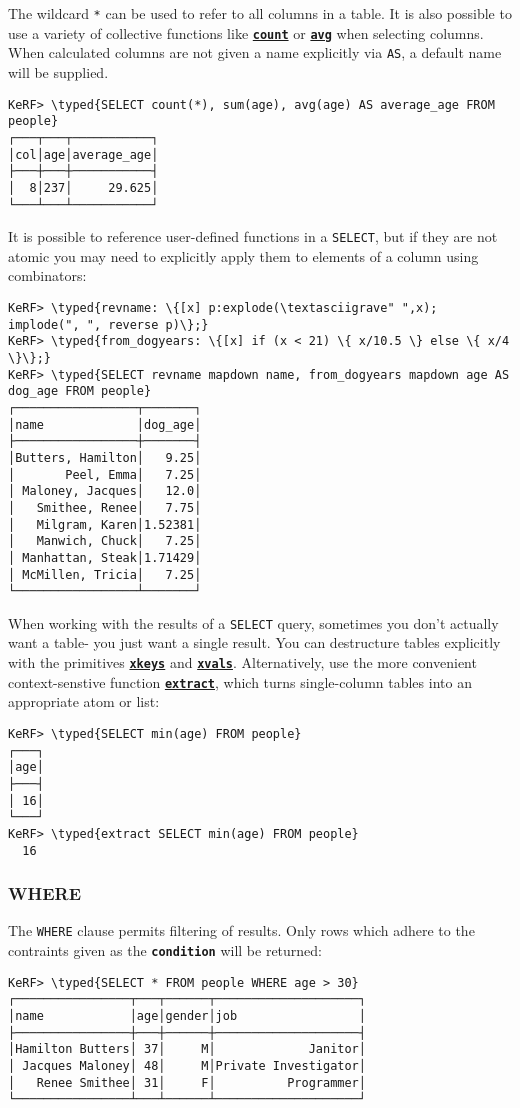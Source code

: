 \documentclass{article}
\newcommand{\typed}[1]{\textcolor{TealBlue}{#1}}
\newcommand{\metasyn}[1]{\texttt{\textbf{#1}}}
\newcommand{\primu}[2]{\hyperref[prim:#2]{\textbf{\texttt{#1}}}}
\newcommand{\prim}[1]{\primu{#1}{#1}}
\begin{document}
\pagebreak
The wildcard \texttt{*} can be used to refer to all columns in a table. It is also possible to use a variety of collective functions like \prim{count} or \prim{avg} when selecting columns. When calculated columns are not given a name explicitly via \texttt{AS}, a default name will be supplied.
\begin{Verbatim}
KeRF> \typed{SELECT count(*), sum(age), avg(age) AS average_age FROM people}
┌───┬───┬───────────┐
│col│age│average_age│
├───┼───┼───────────┤
│  8│237│     29.625│
└───┴───┴───────────┘
\end{Verbatim}

It is possible to reference user-defined functions in a \texttt{SELECT}, but if they are not atomic you may need to explicitly apply them to elements of a column using combinators:
\begin{Verbatim}
KeRF> \typed{revname: \{[x] p:explode(\textasciigrave" ",x); implode(", ", reverse p)\};}
KeRF> \typed{from_dogyears: \{[x] if (x < 21) \{ x/10.5 \} else \{ x/4 \}\};}
KeRF> \typed{SELECT revname mapdown name, from_dogyears mapdown age AS dog_age FROM people}
┌─────────────────┬───────┐
│name             │dog_age│
├─────────────────┼───────┤
│Butters, Hamilton│   9.25│
│       Peel, Emma│   7.25│
│ Maloney, Jacques│   12.0│
│   Smithee, Renee│   7.75│
│   Milgram, Karen│1.52381│
│   Manwich, Chuck│   7.25│
│ Manhattan, Steak│1.71429│
│ McMillen, Tricia│   7.25│
└─────────────────┴───────┘
\end{Verbatim}

When working with the results of a \texttt{SELECT} query, sometimes you don't actually want a table- you just want a single result. You can destructure tables explicitly with the primitives \prim{xkeys} and \prim{xvals}. Alternatively, use the more convenient context-senstive function \prim{extract}, which turns single-column tables into an appropriate atom or list:
\begin{Verbatim}
KeRF> \typed{SELECT min(age) FROM people}
┌───┐
│age│
├───┤
│ 16│
└───┘
KeRF> \typed{extract SELECT min(age) FROM people}
  16
\end{Verbatim}

\pagebreak
\subsubsection{WHERE}
The \texttt{WHERE} clause permits filtering of results. Only rows which adhere to the contraints given as the \metasyn{condition} will be returned:
\begin{Verbatim}
KeRF> \typed{SELECT * FROM people WHERE age > 30}
┌────────────────┬───┬──────┬────────────────────┐
│name            │age│gender│job                 │
├────────────────┼───┼──────┼────────────────────┤
│Hamilton Butters│ 37│     M│             Janitor│
│ Jacques Maloney│ 48│     M│Private Investigator│
│   Renee Smithee│ 31│     F│          Programmer│
└────────────────┴───┴──────┴────────────────────┘
\end{Verbatim}
\end{document}
